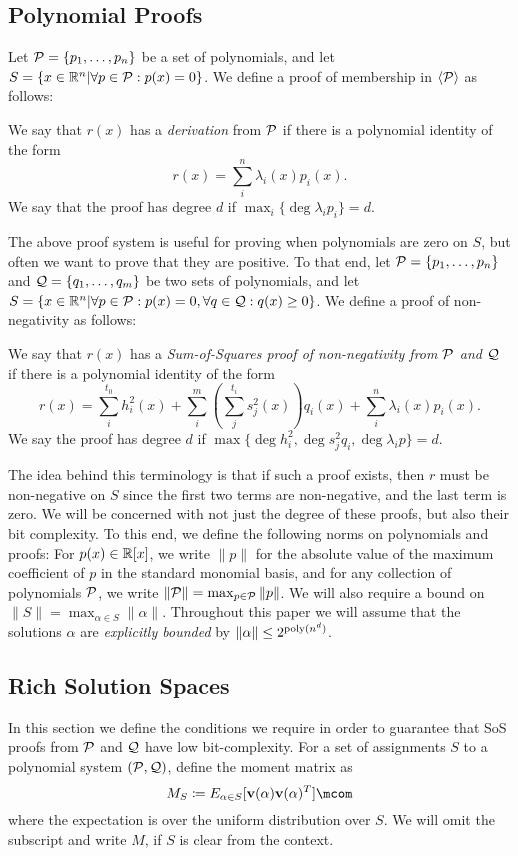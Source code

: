 \subsection{Polynomial Proofs}
Let $\mathcal P = \{p_1,\dots,p_n\}$ be a set of polynomials, and let $S = \{x \in \mathbb R^n | \forall p \in \mathcal P: p(x) = 0\}$. We define a proof of membership in $\langle \mathcal P\rangle$ as follows:
\begin{definition}
We say that $r(x)$ has a \emph{derivation} from $\mathcal P$ if there is a polynomial identity of the form
\[r(x) = \sum_{i}^n \lambda_i(x) p_i(x).\]
We say that the proof has degree $d$ if $\max_i \{\deg \lambda_i p_i\} = d$.
\end{definition}

The above proof system is useful for proving when polynomials are zero on $S$, but often we want to prove that they are positive. To that end, let $\mathcal P = \{p_1,\dots,p_n\}$ and $\mathcal Q = \{q_1,\dots,q_m\}$ be two sets of polynomials, and let $S = \{x \in \mathbb R^n | \forall p \in \mathcal P: p(x) = 0, \forall q \in \mathcal Q: q(x) \geq 0\}$. We define a proof of non-negativity as follows:
\begin{definition}
 We say that $r(x)$ has a \emph{Sum-of-Squares proof of non-negativity from $\mathcal P$ and $\mathcal Q$} if there is a polynomial identity of the form
\[r(x) = \sum_{i}^{t_0} h_i^2(x) + \sum_{i}^m \left(\sum_{j}^{t_i} s_j^2(x)\right)q_i(x) + \sum_{i}^n \lambda_i(x) p_i(x).\]
We say the proof has degree $d$ if $\max \{\deg h_i^2, \deg s_j^2q_i, \deg \lambda_i p\} = d$.
\end{definition}
The idea behind this terminology is that if such a proof exists, then $r$ must be non-negative on $S$ since the first two terms are non-negative, and the last term is zero. We will be concerned with not just the degree of these proofs, but also their bit complexity. To this end, we define the following norms on polynomials and proofs: For $p(x) \in \mathbb R[x]$, we write $\|p\|$ for the absolute value of the maximum coefficient of $p$ in the standard monomial basis, and for any collection of polynomials $\mathcal P$, we write $\|\mathcal P\| = \max_{p \in \mathcal P} \|p\|$. We will also require a bound on $\|S\| = \max_{\alpha \in S} \|\alpha\|$. Throughout this paper we will assume that the solutions $\alpha$ are {\it explicitly bounded} by $\|\alpha\| \leq 2^{\operatorname{poly}(n^d)}$.

\subsection{Rich Solution Spaces}
In this section we define the conditions we require in order to guarantee that SoS proofs from $\mathcal P$ and $\mathcal Q$ have low bit-complexity.
For a set of assignments $S$ to a polynomial system $(\mathcal P,\mathcal Q)$, define the moment matrix as
\[M_S \coloneqq E_{\alpha \in S}[{\bf v}(\alpha){\bf v}(\alpha)^T]\mcom\]
where the expectation is over the uniform distribution over $S$.  We will omit the subscript and write $M$, if $S$ is clear from the context.

